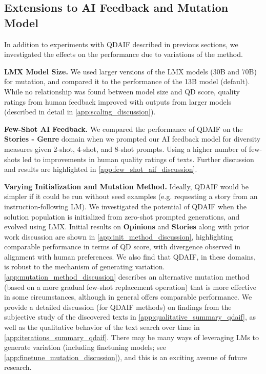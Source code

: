 \subsection{Extensions to AI Feedback and Mutation Model}

In addition to experiments with QDAIF described in previous sections, we investigated the effects on the performance due to variations of the method.

\textbf{LMX Model Size.}
We used larger versions of the LMX models (30B and 70B) for mutation, and compared it to the performance of the 13B model (default). While no relationship was found between model size and QD score, quality ratings from human feedback improved with outputs from larger models (described in detail in \cref{app:scaling_discussion}).

\textbf{Few-Shot AI Feedback.}
We compared the performance of QDAIF on the \textbf{Stories - Genre} domain when we prompted our AI feedback model for diversity measures given 2-shot, 4-shot, and 8-shot prompts. Using a higher number of few-shots led to improvements in human quality ratings of texts. Further discussion and results are highlighted in \cref{app:few_shot_aif_discussion}.

\textbf{Varying Initialization and Mutation Method.}
Ideally, QDAIF would be simpler if it could be run without seed examples (e.g. requesting a story from an instruction-following LM). We investigated the potential of QDAIF when the solution population is initialized from zero-shot prompted generations, and evolved using LMX. Initial results on \textbf{Opinions} and \textbf{Stories} along with prior work discussion are shown in \cref{app:init_method_discussion}, highlighting comparable performance in terms of QD score, with divergence observed in alignment with human preferences. We also find that QDAIF, in these domains, is robust to the mechanism of generating variation. \cref{app:mutation_method_discussion} describes an alternative mutation method (based on a more gradual few-shot replacement operation) that is more effective in some circumstances, although in general offers comparable performance. We provide a detailed discussion (for QDAIF methods) on findings from the subjective study of the discovered texts in \cref{app:qualitative_summary_qdaif}, as well as the qualitative behavior of the text search over time in \cref{app:iterations_summary_qdaif}. There may be many ways of leveraging LMs to generate variation (including finetuning models; see \cref{app:finetune_mutation_discussion}), and this is an exciting avenue of future research.

